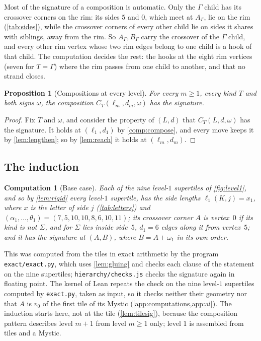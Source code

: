 \documentclass[11pt]{amsart}
\newtheorem{proposition}[theorem]{Proposition}
\newtheorem{computation}[theorem]{Computation}
\theoremstyle{definition}
\theoremstyle{remark}
\newcommand{\code}[1]{\texttt{#1}}
\begin{document}
Most of the signature of a composition is automatic. Only the $\Gamma$ child has its crossover corners on the rim: its
sides $5$ and $0$, which meet at $A_\Gamma$, lie on the rim (\cref{tab:sides}), while the crossover corners of every
other child lie on sides it shares with siblings, away from the rim. So $A_\Gamma,B_\Gamma$ carry the crossover of the
$\Gamma$ child, and every other rim vertex whose two rim edges belong to one child is a hook of that child. The
computation decides the rest: the hooks at the eight rim vertices (seven for $T=\Gamma$) where the rim passes from one
child to another, and that no strand closes.

\begin{proposition}[Compositions at every level]\label{prop:compose}
For every $m\ge1$, every kind $T$ and both signs $\omega$, the composition $C_T(\ell_m,d_m,\omega)$ has the signature.
\end{proposition}

\begin{proof}
Fix $T$ and $\omega$, and consider the property of $(L,d)$ that $C_T(L,d,\omega)$ has the signature. It holds at
$(\ell_1,d_1)$ by \cref{comp:compose}, and every move keeps it by \cref{lem:lengthen}; so by \cref{lem:reach} it holds
at $(\ell_m,d_m)$.
\end{proof}

\subsection{The induction}\label{sec:induct}
\begin{computation}[Base case]\label{comp:base}
Each of the nine level-$1$ supertiles of \cref{fig:level1}, and so by \cref{lem:rigid} every level-$1$ supertile, has
the side lengths $\ell_1(K,j)=x_1$, where $x$ is the letter of side $j$ (\cref{tab:letters}) and
$(\alpha_1,\dots,\theta_1)=(7,5,10,10,8,6,10,11)$; its crossover corner $A$ is vertex~$0$ if its kind is not $\Sigma$,
and for $\Sigma$ lies inside side~$5$, $d_1=6$ edges along it from vertex~$5$; and it has the signature at $(A,B)$,
where $B=A+\omega_1$ in its own order.
\end{computation}

This was computed from the tiles in exact arithmetic by the program \code{exact/exact.py}, which uses \cref{lem:gluing}
and checks each clause of the statement on the nine supertiles; \code{hierarchy/checks.js} checks the signature again
in floating point. The kernel of
Lean repeats the check on the nine level-$1$ supertiles computed by \code{exact.py}, taken as input, so it checks
neither their geometry nor that $A$ is $v_0$ of the first tile of its Mystic (\cref{app:computations,app:ai}). The
induction starts here, not at the tile (\cref{lem:tilesig}), because the composition pattern describes level $m+1$
from level $m\ge1$ only; level $1$ is assembled from tiles and a Mystic.
\end{document}
